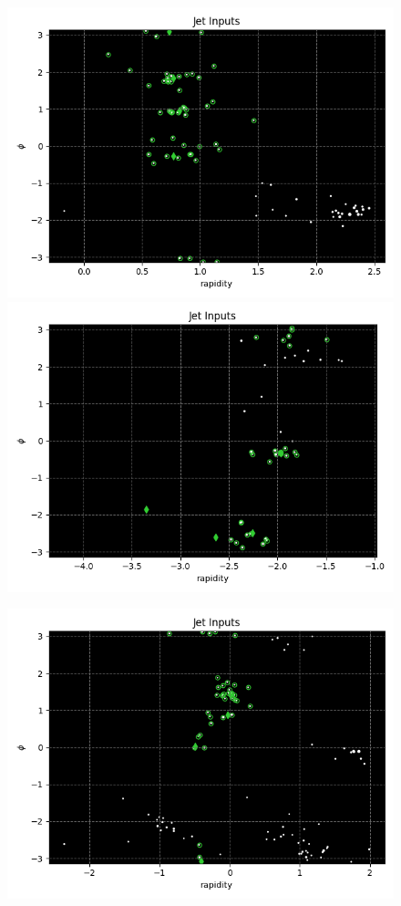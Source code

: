 \begin{figure}[htp]
    \begin{minipage}[c]{0.48\textwidth}
        \includegraphics[width=1\textwidth]{graphics/truth_306.png}
        \includegraphics[width=1\textwidth]{graphics/truth_1936.png}
    \end{minipage}\hfill
    \begin{minipage}[c]{0.48\textwidth}
        \includegraphics[width=1\textwidth]{graphics/truth_423.png}

\end{minipage}
\end{figure}
